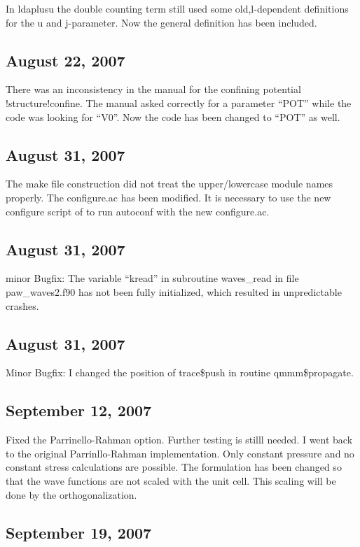 \documentclass[final,12pt]{article}
\begin{document}
In ldaplusu the double counting term still used some old,l-dependent
definitions for the u and j-parameter. Now the general definition has
been included.

\subsection{August 22,  2007}

There was an inconsistency in the manual for the confining potential
!structure!confine. The manual asked correctly for a parameter ``POT''
while the code was looking for ``V0''. Now the code has been changed
to ``POT'' as well.

\subsection{August 31,  2007}

The make file construction did not treat the upper/lowercase module
names properly. The configure.ac has been modified. It is necessary to
use the new configure script of to run autoconf with the new
configure.ac.

\subsection{August 31,  2007}

minor Bugfix: The variable ``kread'' in subroutine waves\_read in file
paw\_waves2.f90 has not been fully initialized, which resulted in
unpredictable crashes.

\subsection{August 31,  2007}

Minor Bugfix: I changed the position of trace\$push in routine
qmmm\$propagate. 

\subsection{September 12,  2007}

Fixed the Parrinello-Rahman option. Further testing is stilll needed. I
went back to the original Parrinllo-Rahman implementation.  Only
constant pressure and no constant stress calculations are possible.
The formulation has been changed so that the wave functions are not
scaled with the unit cell.  This scaling will be done by the
orthogonalization.

\subsection{September 19,  2007}
\end{document}
